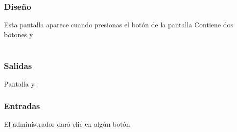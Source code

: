 \subsubsection{Diseño}
	Esta pantalla aparece cuando presionas el botón  de la pantalla  Contiene dos botones  y   \\\\


\subsubsection{Salidas}
	\begin{Citemize}
		\item Pantalla  y . 
	\end{Citemize}
	
\subsubsection{Entradas}
	\begin{Citemize}
		\item El administrador dará clic en algún botón
	\end{Citemize}



